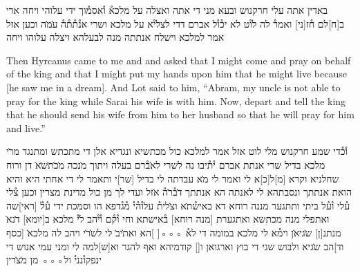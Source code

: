 \begin{aramaictext}
    באדין אתה עלי חרקנוש ובעא מני די אתה ואצלה על
    מלכא֯ ו֯אסמ֯וך ידי עלוהי ויחה ארי ב[ח]לם ח֯ז[ני] ואמר֯ לה לו֯ט לא יכ֯ו֯ל
    אברם דדי לצלי֯א על
    מלכא ושרי אנ֯ת֯ת֯ה֯ ע̇מ̇ה וכען אזל אמר למלכא וישלח אנתתה מנה לבעלהא
    ויצלה עלוהו ויחה
\end{aramaictext}

\begin{translation}
    Then Hyrcanus came to me and and asked that I might come and pray on behalf of
    the king and that I might put my hands upon him that he might live because [he saw me in a dream]. And Lot said to him, ``Abram, my uncle is not able to pray for
    the king while Sarai his wife is with him. Now, depart and tell the king that he should send his wife from him to her husband so that he will pray for him and live.''
\end{translation}

\begin{aramaictext}
    \vacat
    ו֯כ֯די שמע חרקנוש מלי לוט אזל אמר למלכא כול מכתשיא ונגדיא
    אלן די מתכתש ומתנגד מר̇י מלכא בדיל שרי אנתת אברם י֯ת֯יבו נה לשרי
    לא̇ב֯רם בעלה
    ויתוך מ̇נכה מ̇כ̇ת̇ש̇א̇ דן ורוח שחלניא וקרא [מ]ל[כ]א לי ואמר לי מ̇א עבדתה
    לי בדיל [שר]י ותאמר
    לי די אחתי היא והיא הואת אנתתך ונסבתהא לי לאנתה הא אנתתך ד̇ב֯ר̇ה֯
    א̇זל ועדי לך מן
    כול מדינת מצרין וכען צ֯לי ע֯לי ו֯ע֯ל ביתי ותתגער מננה רוחא דא באיש֯ת̇א
    וצ̇לית֯ עלו֯ה֯י֯ מ֯ג֯דפא
    הו וסמכת ידי ע֯ל֯ [ראי]שה ואתפלי מנה מכתשא ואתגערת [מנה רוחא]
    ב֯אישתא וחי ו֯ק֯ם ו֯י֯הב
    ל̇י֯ מלכא ב[יומא] ד̇נא̇ מנתנ[ן] ש̇גיא̇ן וימ֯א לי מלכא במומה די לא֯ ◦◦◦[  
    ]הא ואת̇יב̇ לי
    לש̇ר̇י ויהב לה מלכא̇ [כסף וד]הב ש̇גיא ולבוש שגי די בוץ וארגואן ו[\hspace{1em}]
    קודמיהא ואף להגר וא[ש]למה לי ומני עמי אנוש די ינפקו֯נני֯ ול◦◦◦ מן
    מ̇צ̇רין \vacat
\end{aramaictext}

